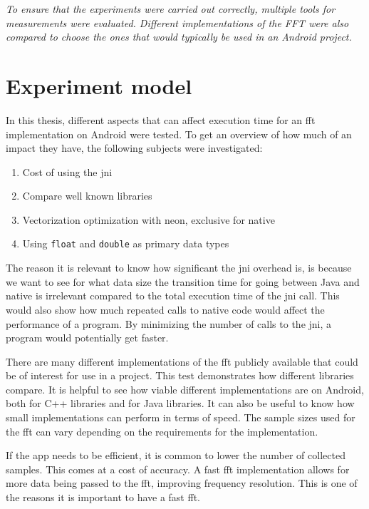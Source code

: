 \textit{To ensure that the experiments were carried out correctly, multiple tools for measurements were evaluated. Different implementations of the FFT were also compared to choose the ones that would typically be used in an Android project.}

\section{Experiment model}


In this thesis, different aspects that can affect execution time for an \gls{fft} implementation on Android were tested. To get an overview of how much of an impact they have, the following subjects were investigated:

\begin{enumerate}
    \item Cost of using the \gls{jni}
    \item Compare well known libraries
    \item Vectorization optimization with \gls{neon}, exclusive for native
    \item Using \texttt{float} and \texttt{double} as primary data types
\end{enumerate}

The reason it is relevant to know how significant the \gls{jni} overhead is, is because we want to see for what data size the transition time for going between Java and native is irrelevant compared to the total execution time of the \gls{jni} call. This would also show how much repeated calls to native code would affect the performance of a program. By minimizing the number of calls to the \gls{jni}, a program would potentially get faster.

There are many different implementations of the \gls{fft} publicly available that could be of interest for use in a project. This test demonstrates how different libraries compare. It is helpful to see how viable different implementations are on Android, both for C++ libraries and for Java libraries. It can also be useful to know how small implementations can perform in terms of speed. The sample sizes used for the \gls{fft} can vary depending on the requirements for the implementation.

If the app needs to be efficient, it is common to lower the number of collected samples. This comes at a cost of accuracy. A fast \gls{fft} implementation allows for more data being passed to the \gls{fft}, improving frequency resolution. This is one of the reasons it is important to have a fast \gls{fft}.

